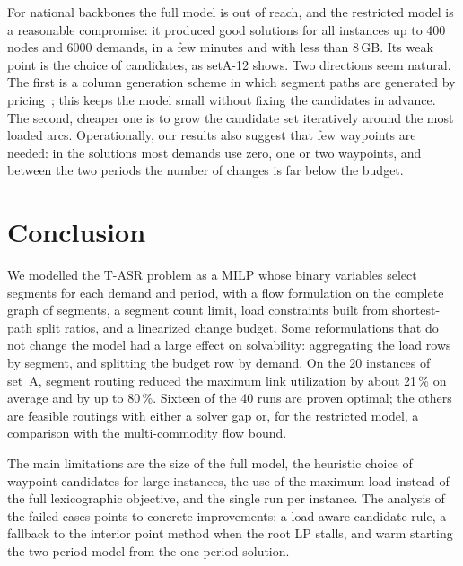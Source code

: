 \documentclass[11pt,a4paper]{article}
\begin{document}
For national backbones the full model is out of reach, and the restricted model is a reasonable
compromise: it produced good solutions for all instances up to 400 nodes and 6000 demands, in a few
minutes and with less than 8\,GB. Its weak point is the choice of candidates, as setA-12 shows. Two
directions seem natural. The first is a column generation scheme in which segment paths are
generated by pricing~\cite{jadin2019}; this keeps the model small without fixing the candidates in
advance. The second, cheaper one is to grow the candidate set iteratively around the most loaded
arcs. Operationally, our results also suggest that few waypoints are needed: in the solutions most
demands use zero, one or two waypoints, and between the two periods the number of changes is far
below the budget.

\section{Conclusion}

We modelled the T-ASR problem as a MILP whose binary variables select segments for each demand and
period, with a flow formulation on the complete graph of segments, a segment count limit, load
constraints built from shortest-path split ratios, and a linearized change budget. Some reformulations
that do not change the model had a large effect on solvability: aggregating the load rows by segment,
and splitting the budget row by demand. On the 20 instances of set~A, segment routing reduced the
maximum link utilization by about 21\,\% on average and by up to 80\,\%. Sixteen of the 40 runs are
proven optimal; the others are feasible routings with either a solver gap or, for the restricted
model, a comparison with the multi-commodity flow bound.

The main limitations are the size of the full model, the heuristic choice of waypoint candidates for
large instances, the use of the maximum load instead of the full lexicographic objective, and the
single run per instance. The analysis of the failed cases points to concrete improvements: a
load-aware candidate rule, a fallback to the interior point method when the root LP stalls, and warm
starting the two-period model from the one-period solution.
\end{document}

